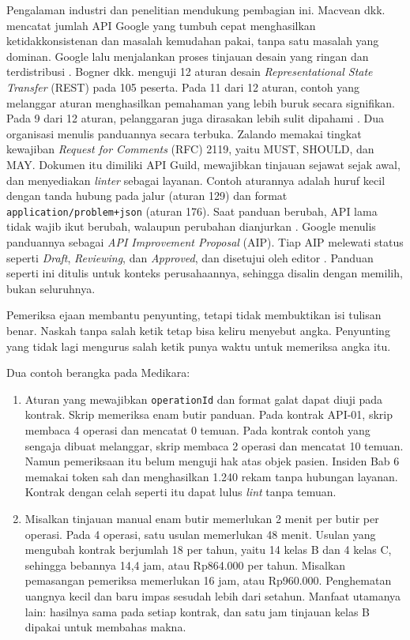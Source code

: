 Pengalaman industri dan penelitian mendukung pembagian ini. Macvean dkk. mencatat jumlah API Google yang tumbuh cepat menghasilkan ketidakkonsistenan
dan masalah kemudahan pakai, tanpa satu masalah yang dominan. Google lalu menjalankan proses tinjauan desain yang ringan dan terdistribusi
\cite{c13-macvean2016}. Bogner dkk. menguji 12 aturan desain \textit{Representational State Transfer} (REST) pada 105 peserta. Pada 11 dari 12 aturan,
contoh yang melanggar aturan menghasilkan pemahaman yang lebih buruk secara signifikan. Pada 9 dari 12 aturan, pelanggaran juga dirasakan lebih sulit
dipahami \cite{c13-bogner2023}. Dua organisasi menulis panduannya secara terbuka. Zalando memakai tingkat kewajiban \textit{Request for Comments} (RFC) 2119, yaitu MUST, SHOULD, dan MAY. Dokumen
itu dimiliki API Guild, mewajibkan tinjauan sejawat sejak awal, dan menyediakan \textit{linter} sebagai layanan. Contoh aturannya adalah huruf kecil dengan
tanda hubung pada jalur (aturan 129) dan format \texttt{application/problem+json} (aturan 176). Saat panduan berubah, API lama tidak wajib ikut berubah,
walaupun perubahan dianjurkan \cite{zalando-guidelines}. Google menulis panduannya sebagai \textit{API Improvement Proposal} (AIP). Tiap AIP melewati status seperti
\textit{Draft}, \textit{Reviewing}, dan \textit{Approved}, dan disetujui oleh editor \cite{c13-google-aip1}. Panduan seperti ini ditulis untuk konteks
perusahaannya, sehingga disalin dengan memilih, bukan seluruhnya.

Pemeriksa ejaan membantu penyunting, tetapi tidak membuktikan isi tulisan benar. Naskah tanpa salah ketik tetap bisa keliru menyebut angka. Penyunting
yang tidak lagi mengurus salah ketik punya waktu untuk memeriksa angka itu.

Dua contoh berangka pada Medikara:
\begin{enumerate}
  \item Aturan yang mewajibkan \texttt{operationId} dan format galat dapat diuji pada kontrak. Skrip 
        memeriksa enam butir panduan. Pada kontrak API-01, skrip membaca 4 operasi dan mencatat 0 temuan. Pada kontrak contoh yang sengaja dibuat melanggar,
        skrip membaca 2 operasi dan mencatat 10 temuan. Namun pemeriksaan itu belum menguji hak atas objek pasien. Insiden Bab 6 memakai token sah dan
        menghasilkan 1.240 rekam tanpa hubungan layanan. Kontrak dengan celah seperti itu dapat lulus \textit{lint} tanpa temuan.
  \item Misalkan tinjauan manual enam butir memerlukan 2 menit per butir per operasi. Pada 4 operasi, satu usulan memerlukan 48 menit. Usulan yang mengubah
        kontrak berjumlah 18 per tahun, yaitu 14 kelas B dan 4 kelas C, sehingga bebannya 14,4 jam, atau Rp864.000 per tahun. Misalkan pemasangan pemeriksa
        memerlukan 16 jam, atau Rp960.000. Penghematan uangnya kecil dan baru impas sesudah lebih dari setahun. Manfaat utamanya lain: hasilnya sama pada
        setiap kontrak, dan satu jam tinjauan kelas B dipakai untuk membahas makna.
\end{enumerate}


